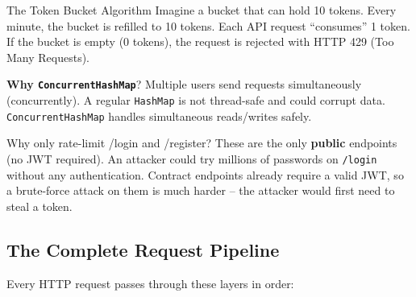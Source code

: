 \documentclass[11pt, a4paper]{article}
\begin{document}
\begin{conceptbox}{The Token Bucket Algorithm}
Imagine a bucket that can hold 10 tokens. Every minute, the bucket is refilled to 10 tokens. Each API request ``consumes'' 1 token. If the bucket is empty (0 tokens), the request is rejected with HTTP 429 (Too Many Requests).

\begin{center}
\end{center}

\textbf{Why \texttt{ConcurrentHashMap}}? Multiple users send requests simultaneously (concurrently). A regular \texttt{HashMap} is not thread-safe and could corrupt data. \texttt{ConcurrentHashMap} handles simultaneous reads/writes safely.
\end{conceptbox}

\begin{interviewbox}{Why only rate-limit /login and /register?}
These are the only \textbf{public} endpoints (no JWT required). An attacker could try millions of passwords on \texttt{/login} without any authentication. Contract endpoints already require a valid JWT, so a brute-force attack on them is much harder -- the attacker would first need to steal a token.
\end{interviewbox}

\subsection{The Complete Request Pipeline}

Every HTTP request passes through these layers in order:
\end{document}
